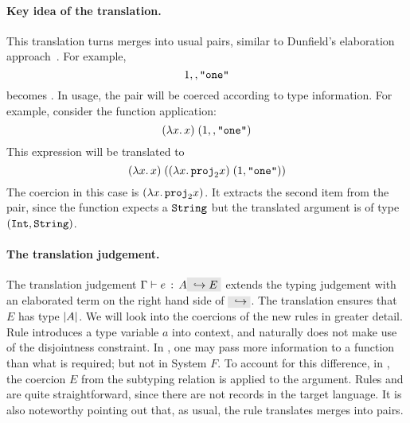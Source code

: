 \paragraph{Key idea of the translation.}
This translation turns merges into usual pairs, similar to Dunfield's
elaboration approach~\cite{dunfield2014elaborating}.
For example, \[ 1 ,, \texttt{"one"} \] becomes 
{}. In usage, the pair will be coerced according to type
information. For example, consider the function application: \[ (\lambda x.\, x) \; (1 ,, \texttt{"one"}) \] This expression will be translated to \[ (\lambda x.\, x) \; ((\lambda x.\, {\texttt{proj}}_{2} x) \; (1, \texttt{"one"})) \] The coercion in this case is $(\lambda x.\, {\texttt{proj}}_{2} x)$. It extracts the second item from the pair, since
the function expects a $\texttt{String}$ but the translated argument is of type $(\texttt{Int}, \texttt{String})$.

\paragraph{The translation judgement.} 
The translation judgement $\jtype \Gamma e A \yields E$ extends the typing judgement with an 
elaborated term on the right hand side of $\yields {}$. 
The translation ensures that $E$ has type $\lvert A \rvert$. 
We will look into the coercions of the new rules in greater detail.
Rule  introduces a type variable $a$ into context, and naturally does not 
make use of the disjointness constraint.
In \name, one may pass more information to a function than what is required; but not in System $F$. 
To account for this difference, in , the
coercion $E$ from the subtyping relation is applied to the argument.
Rules  and  are quite straightforward, since there
are not records in the target language.
It is also noteworthy pointing out that, as usual, the rule  translates merges 
into pairs.




